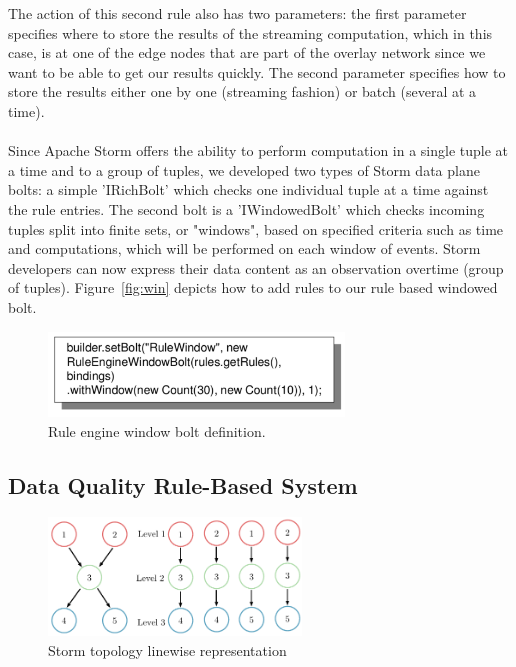 The action of this second rule also has two parameters: the first parameter specifies where to store the results of the streaming computation, which in this case, is at one of the edge nodes that are part of the overlay network since we want to be able to get our results quickly. The second parameter specifies how to store the results either one by one (streaming fashion) or batch (several at a time).
\\
\\
Since Apache Storm offers the ability to perform computation in a single tuple at a time and to a group of tuples, we developed two types of Storm data plane bolts: a simple 'IRichBolt' which checks one individual tuple at a time against the rule entries. The second bolt is a 'IWindowedBolt' which checks incoming tuples split into finite sets, or "windows", based on specified criteria such as time and computations, which will be performed on each window of events. Storm developers can now express their data content as an observation overtime (group of tuples). Figure~\ref{fig:win} depicts how to add rules to our rule based windowed bolt.

\begin{figure}[h!]
  \centering
  \includegraphics[width=0.7\textwidth]{Figures/WindowBolt.pdf}
  \caption{Rule engine window bolt definition.}
  \label{fig:boat1}
\end{figure}

\subsection{Data Quality Rule-Based System}

\begin{figure}[h!]
  \centering
  \includegraphics[width=0.6\textwidth]{Figures/AlgoImg.pdf}
  \caption{Storm topology linewise representation}
  \label{fig:boat1}
\end{figure}

